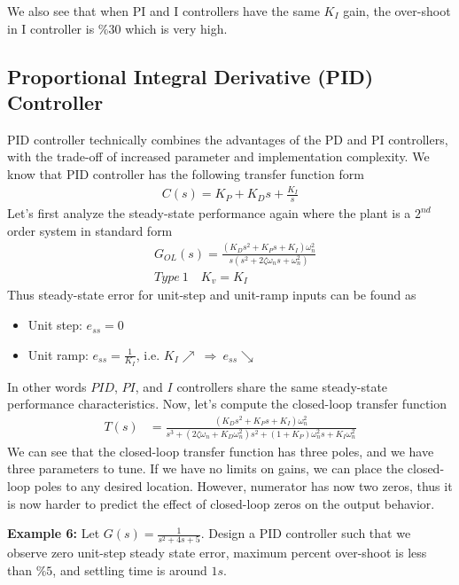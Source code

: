 \documentclass[twoside]{article}
\begin{document}
We also see that when PI and I controllers have the same 
$K_I$ gain, the over-shoot in I controller is $\% 30$ which is very
high. 

\subsection{Proportional Integral Derivative (PID) Controller}

PID controller technically combines the advantages of 
the PD and PI controllers, with the trade-off of increased
parameter and implementation complexity. 
We know that PID controller has the following 
transfer function form
%
\begin{align*}
 C(s) = K_P + K_D s + \frac{K_I}{s}
\end{align*}
%
Let's first analyze the steady-state 
performance again where the plant is a $2^{nd}$ order system in standard form
%
\begin{align*}
  &G_{OL}(s) = \frac{( K_D s^2 +  K_P s +  K_I ) \omega_n^2}{s (s^2 + 2 \zeta
    \omega_n s + \omega_n^2)}
\\
 &Type \ 1 \quad K_v = K_I
\end{align*}
% 
Thus steady-state error for unit-step and unit-ramp inputs can be found
as
\begin{itemize}
\item Unit step: $e_{ss} = 0$ 
\item Unit ramp: $e_{ss} = \frac{1}{K_I}$, i.e. $K_I \nearrow \ \Rightarrow \ e_{ss} \searrow$  
\end{itemize}
In other words $PID$, $PI$, and $I$ controllers share the same steady-state
performance characteristics. Now, let's compute the closed-loop transfer function
%
\begin{align*}
  T(s) &= \frac{( K_D s^2 +  K_P s +  K_I ) \omega_n^2}{ s^3 + (2 \zeta
         \omega_n + K_D \omega_n^2) s^2 + (1 + K_P) \omega_n^2 s +  K_I \omega_n^2}
\end{align*}
%
We can see that the closed-loop transfer function has three poles, and
we have three parameters to tune. If we have no limits on gains, we
can place the closed-loop poles to any desired location. However,
numerator has now two zeros, thus it is now harder to predict the
effect of closed-loop zeros on the output behavior. 

\textbf{Example 6:} Let $G(s) = \frac{1}{s^2 + 4 s + 5}$. Design a
PID controller such that we observe zero unit-step steady state error, 
maximum percent over-shoot is less than $\% 5$, and settling time 
is around $1 s$. 
\end{document}
